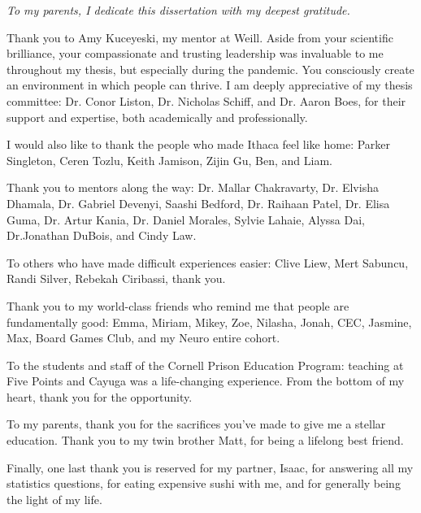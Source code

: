 \documentclass[phd,tocprelim]{cornell}
\begin{document}
\begin{dedication}
\textit{To my parents, I dedicate this dissertation with my deepest gratitude. }

\end{dedication}

\begin{acknowledgements}
Thank you to Amy Kuceyeski, my mentor at Weill. Aside from your scientific brilliance, your compassionate and trusting leadership was invaluable to me throughout my thesis, but especially during the pandemic.  You consciously create an environment in which people can  thrive. I am deeply appreciative of my thesis committee: Dr. Conor Liston, Dr. Nicholas Schiff, and Dr. Aaron Boes, for their support and expertise, both academically and professionally.

I would also like to thank the people who made Ithaca feel like home:  Parker Singleton, Ceren Tozlu, Keith Jamison, Zijin Gu, Ben, and Liam.

Thank you to mentors along the way: Dr. Mallar Chakravarty, Dr. Elvisha Dhamala, Dr. Gabriel Devenyi, Saashi Bedford, Dr. Raihaan Patel,  Dr. Elisa Guma, Dr. Artur Kania,  Dr. Daniel Morales, Sylvie Lahaie, Alyssa Dai,  Dr.Jonathan DuBois,  and Cindy Law.

To others who have made difficult experiences easier: Clive Liew, Mert Sabuncu, Randi Silver, Rebekah Ciribassi, thank you.

Thank you to my world-class friends who remind me that people are fundamentally good: Emma, Miriam, Mikey, Zoe, Nilasha, Jonah, CEC, Jasmine, Max, Board Games Club, and my Neuro entire cohort.

To the students and staff of the Cornell Prison Education Program: teaching at Five Points and Cayuga was a life-changing experience. From the bottom of my heart, thank you for the opportunity.

To my parents, thank you for the sacrifices you’ve made to
give me a stellar education. Thank you to my twin brother Matt, for being a lifelong best friend.

Finally, one last thank you is reserved for my partner, Isaac,  for answering all my statistics questions, for eating expensive sushi with me, and for generally being the light of my life.
\end{acknowledgements}

\contentspage
\tablelistpage
\figurelistpage

\normalspacing \setcounter{page}{1} 
\pagestyle{cornell} \addtolength{\parskip}{0.5\baselineskip}
\end{document}
